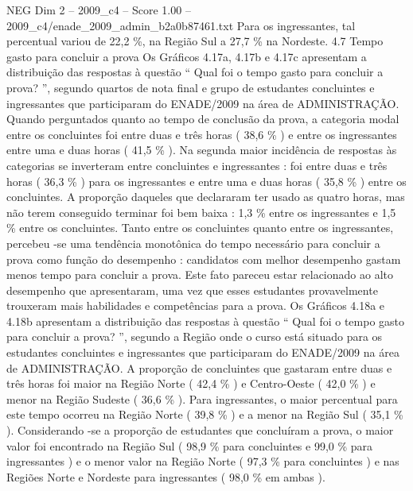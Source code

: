 \begin{textsample}{NEG Dim 2 – 2009\_c4 – Score 1.00 – 2009\_c4/enade\_2009\_admin\_b2a0b87461.txt}
Para os ingressantes, tal percentual variou de 22,2 \%, na Região Sul a 27,7 \% na Nordeste. 4.7 Tempo gasto para concluir a prova Os Gráficos 4.17a, 4.17b e 4.17c apresentam a distribuição das respostas à questão “ Qual foi o tempo gasto para concluir a prova? ”, segundo quartos de nota final e grupo de estudantes concluintes e ingressantes que participaram do ENADE/2009 na área de ADMINISTRAÇÃO.
Quando perguntados quanto ao tempo de conclusão da prova, a categoria modal entre os concluintes foi entre duas e três horas ( 38,6 \% ) e entre os ingressantes entre uma e duas horas ( 41,5 \% ).
Na segunda maior incidência de respostas às categorias se inverteram entre concluintes e ingressantes : foi entre duas e três horas ( 36,3 \% ) para os ingressantes e entre uma e duas horas ( 35,8 \% ) entre os concluintes.
A proporção daqueles que declararam ter usado as quatro horas, mas não terem conseguido terminar foi bem baixa : 1,3 \% entre os ingressantes e 1,5 \% entre os concluintes.
Tanto entre os concluintes quanto entre os ingressantes, percebeu -se uma tendência monotônica do tempo necessário para concluir a prova como função do desempenho : candidatos com melhor desempenho gastam menos tempo para concluir a prova.
Este fato pareceu estar relacionado ao alto desempenho que apresentaram, uma vez que esses estudantes provavelmente trouxeram mais habilidades e competências para a prova.
Os Gráficos 4.18a e 4.18b apresentam a distribuição das respostas à questão “ Qual foi o tempo gasto para concluir a prova? ”, segundo a Região onde o curso está situado para os estudantes concluintes e ingressantes que participaram do ENADE/2009 na área de ADMINISTRAÇÃO.
A proporção de concluintes que gastaram entre duas e três horas foi maior na Região Norte ( 42,4 \% ) e Centro-Oeste ( 42,0 \% ) e menor na Região Sudeste ( 36,6 \% ).
Para ingressantes, o maior percentual para este tempo ocorreu na Região Norte ( 39,8 \% ) e a menor na Região Sul ( 35,1 \% ).
Considerando -se a proporção de estudantes que concluíram a prova, o maior valor foi encontrado na Região Sul ( 98,9 \% para concluintes e 99,0 \% para ingressantes ) e o menor valor na Região Norte ( 97,3 \% para concluintes ) e nas Regiões Norte e Nordeste para ingressantes ( 98,0 \% em ambas ).

\end{textsample}
